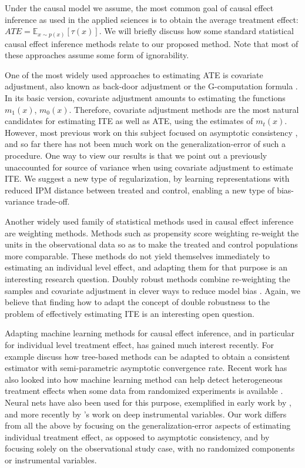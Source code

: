 \documentclass{article}
\def\E{\mathbb{E}}
\begin{document}
Under the causal model we assume, the most common goal of causal effect inference as used in the applied sciences is to obtain the average treatment effect: $ATE=\E_{x \sim p(x)}\left[\tau(x)\right]$. We will briefly discuss how some standard statistical causal effect inference methods relate to our proposed method. Note that most of these approaches assume some form of ignorability.

One of the most widely used approaches to estimating ATE is covariate adjustment, also known as back-door adjustment or the G-computation formula \citep{pearl2009causality,rubin2011causal}. In its basic version, covariate adjustment amounts to estimating the functions $m_1(x)$, $m_0(x)$. Therefore, covariate adjustment methods are the most natural candidates for estimating ITE as well as ATE, using the estimates of $m_t(x)$. However, most previous work on this subject focused on asymptotic consistency \citep{belloni2014inference,athey2016efficient,chernozhukov2016double}, and so far there has not been much work on the generalization-error of such a procedure. One way to view our results is that we point out a previously unaccounted for source of variance when using covariate adjustment to estimate ITE. We suggest a new type of regularization, by learning representations with reduced IPM distance between treated and control, enabling a new type of bias-variance trade-off.

Another widely used family of statistical methods used in causal effect inference are weighting methods. Methods such as propensity score weighting \citep{austin2011introduction} re-weight the units in the observational data so as to make the treated and control populations more comparable. These methods do not yield themselves immediately to estimating an individual level effect, and adapting them for that purpose is an interesting research question.
Doubly robust methods combine re-weighting the samples and covariate adjustment in clever ways to reduce model bias \citep{funk2011doubly}. Again, we believe that finding how to adapt the concept of double robustness to the problem of effectively estimating ITE is an interesting open question.


Adapting machine learning methods for causal effect inference, and in particular for individual level treatment effect, has gained much interest recently. For example \citet{wager2015estimation,athey2016recursive} discuss how tree-based methods can be adapted to obtain a consistent estimator with semi-parametric asymptotic convergence rate. Recent work has also looked into how machine learning method can help detect heterogeneous treatment effects when some data from randomized experiments is available \citep{taddy2016nonparametric,peysakhovich2016combining}.
Neural nets have also been used for this purpose, exemplified in early work by \citet{beck2000improving}, and more recently by \citet{hartford2016counterfactual}'s work on deep instrumental variables.
Our work differs from all the above by focusing on the generalization-error aspects of estimating individual treatment effect, as opposed to asymptotic consistency, and by focusing solely on the observational study case, with no randomized components or instrumental variables.
\end{document}
